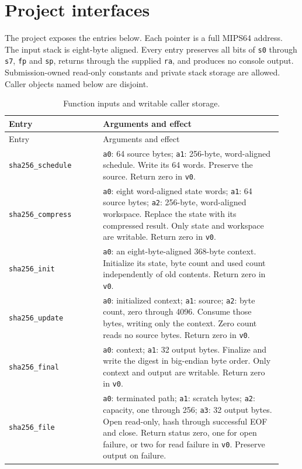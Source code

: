 \section*{Project interfaces}
The project exposes the entries below. Each pointer is a full MIPS64 address. The input
stack is eight-byte aligned. Every entry preserves all bits of \texttt{s0} through
\texttt{s7}, \texttt{fp} and \texttt{sp}, returns through the supplied \texttt{ra},
and produces no console output. Submission-owned read-only constants and private stack
storage are allowed. Caller objects named below are disjoint.

\begin{longtable}{p{0.32\linewidth}p{0.61\linewidth}}
  \caption{Function inputs and writable caller storage.}                                      \\
  \toprule
  Entry                     & Arguments and effect                                            \\
  \midrule
  \endfirsthead
  \toprule Entry            & Arguments and effect                                            \\\midrule
  \endhead
  \texttt{sha256\_schedule} & \texttt{a0}: 64 source bytes; \texttt{a1}: 256-byte,
  word-aligned schedule. Write its 64 words. Preserve the source. Return zero in \texttt{v0}. \\
  \texttt{sha256\_compress} & \texttt{a0}: eight word-aligned state words;
  \texttt{a1}: 64 source bytes; \texttt{a2}: 256-byte, word-aligned workspace.
  Replace the state with its compressed result. Only state and workspace are writable.
  Return zero in \texttt{v0}.                                                                 \\
  \texttt{sha256\_init}     & \texttt{a0}: an eight-byte-aligned 368-byte context.
  Initialize its state, byte count and used count independently of old contents.
  Return zero in \texttt{v0}.                                                                 \\
  \texttt{sha256\_update}   & \texttt{a0}: initialized context; \texttt{a1}: source;
  \texttt{a2}: byte count, zero through 4096. Consume those bytes, writing only the
  context. Zero count reads no source bytes. Return zero in \texttt{v0}.                      \\
  \texttt{sha256\_final}    & \texttt{a0}: context; \texttt{a1}: 32 output bytes.
  Finalize and write the digest in big-endian byte order. Only context and output are
  writable. Return zero in \texttt{v0}.                                                       \\
  \texttt{sha256\_file}     & \texttt{a0}: terminated path; \texttt{a1}: scratch bytes;
  \texttt{a2}: capacity, one through 256; \texttt{a3}: 32 output bytes. Open read-only,
  hash through successful EOF and close. Return status zero, one for open failure, or
  two for read failure in \texttt{v0}. Preserve output on failure.                            \\
  \bottomrule
\end{longtable}

